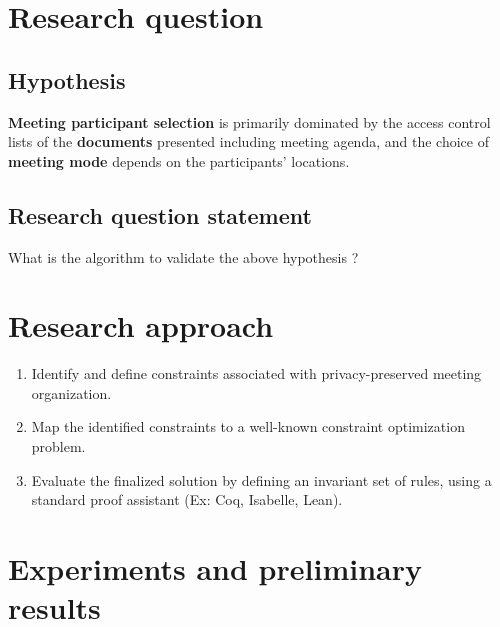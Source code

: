 \begin{spacing}{1.0}
    \section{Research question}
    \subsection{Hypothesis}
    \par \textbf{Meeting participant selection} is primarily dominated by the access control lists of the \textbf{documents} presented including meeting agenda, and the choice of \textbf{meeting mode} depends on the participants’ locations.
    \subsection{Research question statement}
    \par What is the algorithm to validate the above hypothesis ?
    
    \section{Research approach}
    \begin{enumerate}
        \item Identify and define constraints associated with privacy-preserved meeting organization.
        \item Map the identified constraints to a well-known constraint optimization problem.
        \item Evaluate the finalized solution by defining an invariant set of rules, using a standard proof assistant (Ex: Coq, Isabelle, Lean).
    \end{enumerate}

    \section{Experiments and preliminary results}

\end{spacing}
